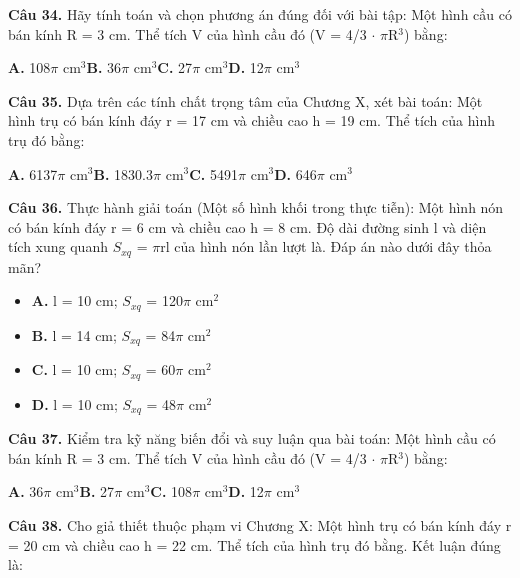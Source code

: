 \documentclass[11pt,a4paper]{article}
\begin{document}
\textbf{\color{primary} Câu 34.} Hãy tính toán và chọn phương án đúng đối với bài tập: Một hình cầu có bán kính R = 3 cm. Thể tích V của hình cầu đó (V = 4/3 $\cdot$ $\pi$R$^3$) bằng:\par
\hspace*{1.5em}\textbf{A.} 108$\pi$ cm$^3$\quad\quad \textbf{B.} 36$\pi$ cm$^3$\quad\quad \textbf{C.} 27$\pi$ cm$^3$\quad\quad \textbf{D.} 12$\pi$ cm$^3$\par\vspace{2pt}
\textbf{\color{primary} Câu 35.} Dựa trên các tính chất trọng tâm của Chương X, xét bài toán: Một hình trụ có bán kính đáy r = 17 cm và chiều cao h = 19 cm. Thể tích của hình trụ đó bằng:\par
\hspace*{1.5em}\textbf{A.} 6137$\pi$ cm$^3$\quad\quad \textbf{B.} 1830.3$\pi$ cm$^3$\quad\quad \textbf{C.} 5491$\pi$ cm$^3$\quad\quad \textbf{D.} 646$\pi$ cm$^3$\par\vspace{2pt}
\textbf{\color{primary} Câu 36.} Thực hành giải toán (Một số hình khối trong thực tiễn): Một hình nón có bán kính đáy r = 6 cm và chiều cao h = 8 cm. Độ dài đường sinh l và diện tích xung quanh $S_{xq}$ = $\pi$rl của hình nón lần lượt là. Đáp án nào dưới đây thỏa mãn?\par
\begin{itemize}\setlength{\itemsep}{1pt}\setlength{\parskip}{0pt}
  \item[] \textbf{A.} l = 10 cm; $S_{xq}$ = 120$\pi$ cm$^2$
  \item[] \textbf{B.} l = 14 cm; $S_{xq}$ = 84$\pi$ cm$^2$
  \item[] \textbf{C.} l = 10 cm; $S_{xq}$ = 60$\pi$ cm$^2$
  \item[] \textbf{D.} l = 10 cm; $S_{xq}$ = 48$\pi$ cm$^2$
\end{itemize}\vspace{2pt}
\textbf{\color{primary} Câu 37.} Kiểm tra kỹ năng biến đổi và suy luận qua bài toán: Một hình cầu có bán kính R = 3 cm. Thể tích V của hình cầu đó (V = 4/3 $\cdot$ $\pi$R$^3$) bằng:\par
\hspace*{1.5em}\textbf{A.} 36$\pi$ cm$^3$\quad\quad \textbf{B.} 27$\pi$ cm$^3$\quad\quad \textbf{C.} 108$\pi$ cm$^3$\quad\quad \textbf{D.} 12$\pi$ cm$^3$\par\vspace{2pt}
\textbf{\color{primary} Câu 38.} Cho giả thiết thuộc phạm vi Chương X: Một hình trụ có bán kính đáy r = 20 cm và chiều cao h = 22 cm. Thể tích của hình trụ đó bằng. Kết luận đúng là:\par
\end{document}
